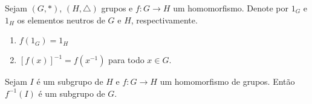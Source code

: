 \documentclass{beamer}
\begin{document}
    \begin{frame}
        \begin{proposicao}
            Sejam $(G, *)$, \pause $(H, \triangle)$ grupos \pause e $f : G \to H$ um homomorfismo. \pause Denote por $1_G$ \pause e $1_H$ \pause os elementos neutros de $G$ e $H$, \pause respectivamente.\pause
            \begin{enumerate}[label={\roman*})]
                \item $f(1_G) = 1_H$\pause
                \item $[f(x)]^{-1} = f(x^{-1})$ \pause para todo $x \in G$.
            \end{enumerate}
        \end{proposicao}
    \end{frame}

    \begin{frame}
        \begin{proposicao}
            Sejam $I$ \'e um subgrupo de $H$ \pause e $f : G \to H$ \pause um homomorfismo de grupos. \pause Ent\~ao $f^{-1}(I)$ \pause \'e um subgrupo de $G$.
        \end{proposicao}
    \end{frame}
\end{document}
